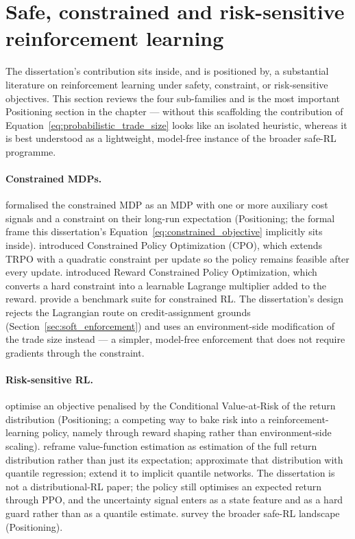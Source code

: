 \section{Safe, constrained and risk-sensitive reinforcement learning}
\label{sec:safe_rl}

The dissertation's contribution sits inside, and is positioned by, a substantial literature on reinforcement learning under safety, constraint, or risk-sensitive objectives. This section reviews the four sub-families and is the most important Positioning section in the chapter --- without this scaffolding the contribution of Equation~\ref{eq:probabilistic_trade_size} looks like an isolated heuristic, whereas it is best understood as a lightweight, model-free instance of the broader safe-RL programme.

\paragraph{Constrained MDPs.} \textcite{altman1999constrained} formalised the constrained MDP as an MDP with one or more auxiliary cost signals and a constraint on their long-run expectation (Positioning; the formal frame this dissertation's Equation~\ref{eq:constrained_objective} implicitly sits inside). \textcite{achiam2017cpo} introduced Constrained Policy Optimization (CPO), which extends TRPO with a quadratic constraint per update so the policy remains feasible after every update. \textcite{tessler2019reward} introduced Reward Constrained Policy Optimization, which converts a hard constraint into a learnable Lagrange multiplier added to the reward. \textcite{ray2019benchmarking} provide a benchmark suite for constrained RL. The dissertation's design rejects the Lagrangian route on credit-assignment grounds (Section~\ref{sec:soft_enforcement}) and uses an environment-side modification of the trade size instead --- a simpler, model-free enforcement that does not require gradients through the constraint.

\paragraph{Risk-sensitive RL.} \textcite{chow2015risk} optimise an objective penalised by the Conditional Value-at-Risk of the return distribution (Positioning; a competing way to bake risk into a reinforcement-learning policy, namely through reward shaping rather than environment-side scaling). \textcite{bellemare2017distributional} reframe value-function estimation as estimation of the full return distribution rather than just its expectation; \textcite{dabney2018qrdqn} approximate that distribution with quantile regression; \textcite{dabney2018iqn} extend it to implicit quantile networks. The dissertation is not a distributional-RL paper; the policy still optimises an expected return through PPO, and the uncertainty signal enters as a state feature and as a hard guard rather than as a quantile estimate. \textcite{garcia2015safe} survey the broader safe-RL landscape (Positioning).

